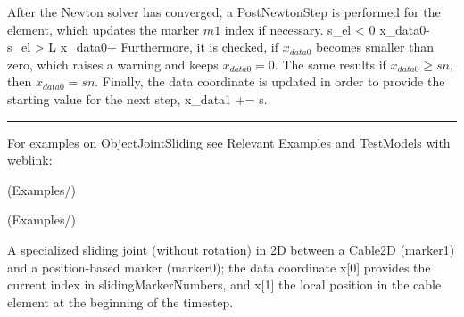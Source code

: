     After the Newton solver has converged, a PostNewtonStep is performed for the element, which
    updates the marker $m1$ index if necessary.
    \bea
      s_{el} < 0 \quad \ra \quad x_{data0}\;-\! \nonumber\\
      s_{el} > L \quad \ra \quad x_{data0}\;+\!
    \eea
    Furthermore, it is checked, if $x_{data0}$ becomes smaller than zero, which raises a warning and keeps $x_{data0}=0$.
    The same results if $x_{data0}\ge sn$, then $x_{data0} = sn$.
    Finally, the data coordinate is updated in order to provide the starting value for the next step,
    \be
      x_{data1} \;+\!\!= s.
    \ee
\vspace{6pt}\par\noindent\rule{\textwidth}{0.4pt}
%
\noindent For examples on ObjectJointSliding see Relevant Examples and TestModels with weblink:
\bi
\item {} (Examples/)
\item {} (Examples/)

\ei

%
\newpage


\label{sec:item:ObjectJointSliding2D}
A specialized sliding joint (without rotation) in 2D between a Cable2D (marker1) and a position-based marker (marker0); the data coordinate x[0] provides the current index in slidingMarkerNumbers, and x[1] the local position in the cable element at the beginning of the timestep.
\vspace{12pt}\\

